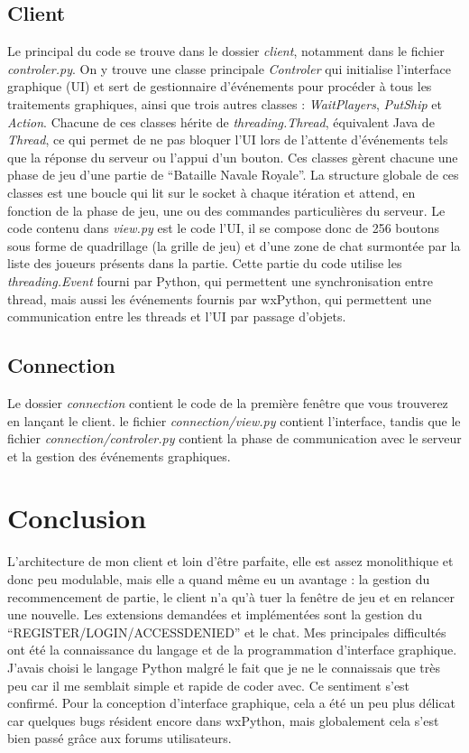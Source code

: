 \documentclass[a4paper, 11pt]{report}
\begin{document}
\subsection{Client}
Le principal du code se trouve dans le dossier \emph{client}, notamment dans le fichier \emph{controler.py}.
On y trouve une classe principale \emph{Controler} qui initialise l'interface graphique (UI) et sert de gestionnaire d'événements pour procéder à tous les traitements graphiques, 
ainsi que trois autres classes : 
\emph{WaitPlayers}, \emph{PutShip} et \emph{Action}. Chacune de ces classes hérite de \emph{threading.Thread}, équivalent Java de 
\emph{Thread}, ce qui permet de ne pas bloquer l'UI lors de l'attente d'événements tels que la réponse du serveur ou l'appui d'un bouton. 
Ces classes gèrent chacune une phase de jeu d'une partie de ``Bataille Navale Royale''.
La structure globale de ces classes est une boucle qui lit sur le socket à chaque itération et attend, en fonction de la phase de jeu, une ou des commandes particulières du serveur. 
\newline
Le code contenu dans \emph{view.py} est le code l'UI, il se compose donc de 256 boutons sous forme de quadrillage (la grille de jeu) et d'une zone de chat surmontée par la liste 
des joueurs présents dans la partie.
\newline
Cette partie du code utilise les \emph{threading.Event} fourni par Python, qui permettent une synchronisation entre thread, mais aussi les 
événements fournis par wxPython, qui permettent une communication entre les threads et l'UI par passage d'objets.

\subsection{Connection}
Le dossier \emph{connection} contient le code de la première fenêtre que vous trouverez en lançant le client. 
le fichier \emph{connection/view.py} contient l'interface, tandis que le fichier \emph{connection/controler.py} contient 
la phase de communication avec le serveur et la gestion des événements graphiques.

\section{Conclusion}
L'architecture de mon client et loin d'être parfaite, elle est assez monolithique et donc peu modulable, mais elle a quand même eu un avantage :
la gestion du recommencement de partie, le client n'a qu'à tuer la fenêtre de jeu et en relancer une nouvelle.
Les extensions demandées et implémentées sont la gestion du ``REGISTER/LOGIN/ACCESSDENIED'' et le chat.
\newline
Mes principales difficultés ont été la connaissance du langage et de la programmation d'interface graphique. 
J'avais choisi le langage Python malgré le fait que je ne le connaissais que très peu car il me semblait simple et rapide de coder avec. 
Ce sentiment s'est confirmé. Pour la conception d'interface graphique, cela a été un peu plus délicat car quelques bugs résident encore dans 
wxPython, mais globalement cela s'est bien passé grâce aux forums utilisateurs.
\end{document}
